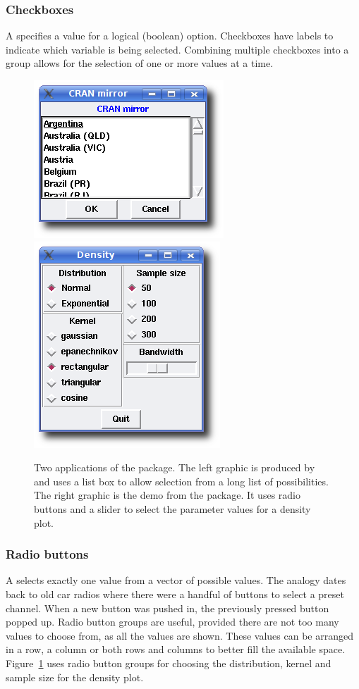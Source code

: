 \subsubsection{Checkboxes}
\label{sec:GUI:checkboxes}

A  specifies a value for a logical
(boolean) option. Checkboxes have labels to indicate which variable is
being selected. Combining multiple checkboxes into a group allows for
the selection of one or more values at a time.

\begin{figure}
  \centering
  \includegraphics[width=.35\textwidth]{ex-listbox}
  \includegraphics[width=.35\textwidth]{tcltk-tkdensity}
  \caption{
    Two applications of the  package. 
    The left graphic is
    produced by  and uses a list box to
    allow selection from a long list of possibilities.
    The right graphic is the  demo from the
    package. It uses radio buttons and a slider to select the
    parameter values for a density plot.
  }
  \label{fig:GUI:ex-tcltk}
\end{figure}

\subsubsection{Radio buttons}
\label{sec:GUI:radio=button-groups}

A  selects exactly one value from a vector of
possible values. The analogy dates back to old car radios where there
were a handful of buttons to select a preset channel. When a new
button was pushed in, the previously pressed button popped up.  Radio
button groups are useful, provided there are not too many values to
choose from, as all the values are shown. These values can be arranged
in a row, a column or both rows and columns to better fill the
available space. Figure~\ref{fig:GUI:ex-tcltk} uses radio button
groups for choosing the distribution, kernel and sample size for the
density plot.


